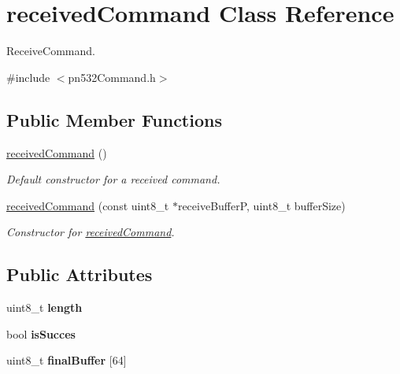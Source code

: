 \hypertarget{classreceivedCommand}{}\section{received\+Command Class Reference}
\label{classreceivedCommand}


Receive\+Command.  




{\ttfamily \#include $<$pn532\+Command.\+h$>$}

\subsection*{Public Member Functions}
\begin{DoxyCompactItemize}
\item 
\hyperlink{classreceivedCommand_afb5a185c80e16ed6fa13c3fad7166e2a}{received\+Command} ()
\begin{DoxyCompactList}\small\item\em Default constructor for a received command. \end{DoxyCompactList}\item 
\hyperlink{classreceivedCommand_a3bfe79f6fc149ea4c2f42a86fe5081cb}{received\+Command} (const uint8\+\_\+t $\ast$receive\+BufferP, uint8\+\_\+t buffer\+Size)
\begin{DoxyCompactList}\small\item\em Constructor for \hyperlink{classreceivedCommand}{received\+Command}. \end{DoxyCompactList}\end{DoxyCompactItemize}
\subsection*{Public Attributes}
\begin{DoxyCompactItemize}
\item 
\mbox{\label{classreceivedCommand_a615a15c23ead55d519facf8834f4b772}} 
uint8\+\_\+t {\bfseries length}
\item 
\mbox{\label{classreceivedCommand_ac6bc59f8d3cd3c398a684e7dae7aedeb}} 
bool {\bfseries is\+Succes}
\item 
\mbox{\label{classreceivedCommand_af5fbdfb7119f355bca7ae8f42f0116d1}} 
uint8\+\_\+t {\bfseries final\+Buffer} \mbox{[}64\mbox{]}
\end{DoxyCompactItemize}


